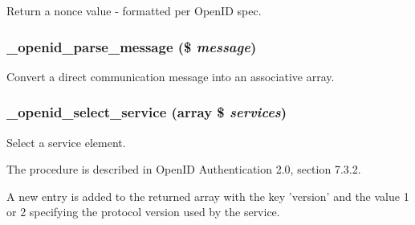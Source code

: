 \label{openid_8inc_a7f413b6dbcae0aab572b51b57f08b076}
Return a nonce value -\/ formatted per OpenID spec. \hypertarget{openid_8inc_ab5f88df8b540f08bd28e8a508bb49175}{
\subsubsection[{\_\-openid\_\-parse\_\-message}]{\setlength{\rightskip}{0pt plus 5cm}\_\-openid\_\-parse\_\-message (\$ {\em message})}}
\label{openid_8inc_ab5f88df8b540f08bd28e8a508bb49175}
Convert a direct communication message into an associative array. \hypertarget{openid_8inc_aa8b2298a6e68ea456e22b33b44aa276b}{
\subsubsection[{\_\-openid\_\-select\_\-service}]{\setlength{\rightskip}{0pt plus 5cm}\_\-openid\_\-select\_\-service (array \$ {\em services})}}
\label{openid_8inc_aa8b2298a6e68ea456e22b33b44aa276b}
Select a service element.

The procedure is described in OpenID Authentication 2.0, section 7.3.2.

A new entry is added to the returned array with the key 'version' and the value 1 or 2 specifying the protocol version used by the service.


